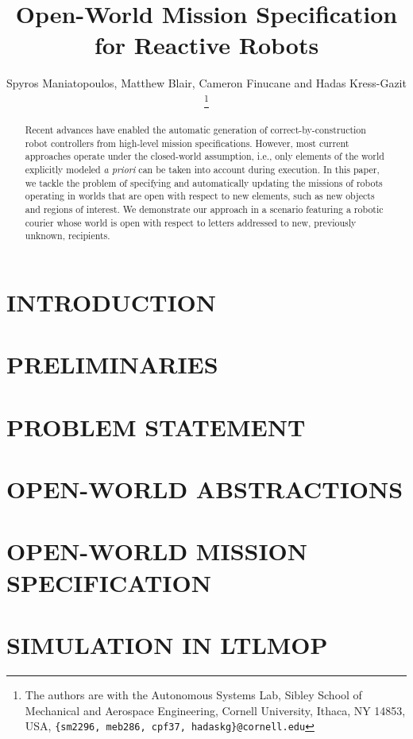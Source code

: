 \documentclass[letterpaper, 10 pt, conference]{ieeeconf}  %
\title{\LARGE \bf
	Open-World Mission Specification for Reactive Robots
}
\author{Spyros Maniatopoulos, Matthew Blair, Cameron Finucane and Hadas Kress-Gazit%
\thanks{The authors are with the Autonomous Systems Lab, Sibley School of Mechanical and Aerospace Engineering, Cornell University, Ithaca, NY 14853, USA, {\tt \{sm2296, meb286, cpf37, hadaskg\}\nolinkurl{@cornell.edu}}}%
}
\begin{document}
%
\maketitle
\thispagestyle{empty}
\pagestyle{empty}
%
\begin{abstract}

Recent advances have enabled the automatic generation of correct-by-construction robot controllers from high-level mission specifications. However, most current approaches operate under the closed-world assumption, i.e., only elements of the world explicitly modeled \emph{a priori} can be taken into account during execution. In this paper, we tackle the problem of specifying and automatically updating the missions of robots operating in worlds that are open with respect to new elements, such as new objects and regions of interest. We demonstrate our approach in a scenario featuring a robotic courier whose world is open with respect to letters addressed to new, previously unknown, recipients.

\end{abstract}
%
%
\section{INTRODUCTION}

%
\section{PRELIMINARIES}\label{preliminaries}

%
\section{PROBLEM STATEMENT}\label{problem}

%
\section{OPEN-WORLD ABSTRACTIONS}\label{abstractions}

%
\section{OPEN-WORLD MISSION SPECIFICATION}\label{openworld}

%
\section{SIMULATION IN LTLMOP}\label{simulation}  %

%
\end{document}
